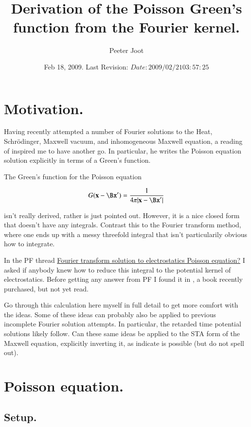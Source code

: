 \documentclass{article}
\title{ Derivation of the Poisson Green's function from the Fourier kernel. }
\author{Peeter Joot}
\date{ Feb 18, 2009.  Last Revision: $Date: 2009/02/21 03:57:25 $ }
\begin{document}
\maketitle{}
\tableofcontents

\section{ Motivation.}

Having recently attempted a number of Fourier solutions to the Heat, Schr\"{o}dinger, Maxwell vacuum, and inhomogeneous Maxwell equation, a reading
of \cite{mjPerryElectrodynamics} inspired me to have another go.  In particular, he writes the Poisson equation solution explicitly in terms of a Green's 
function.

The Green's function for the Poisson equation

\begin{align}
G(\mathbf{x} - \Bx') = \frac{1}{4\pi\lvert{\mathbf{x} -\Bx'}\rvert}
\end{align}

isn't really derived, rather is just pointed out.  However, it is a nice closed form that doesn't have any integrals.
Contrast this to the Fourier transform method, where one ends up with a messy threefold 
integral that isn't particularily obvious how to integrate.

In the PF thread \href{http://www.physicsforums.com/showthread.php?t=293550}{Fourier transform solution to electrostatics Poisson equation?}
I asked if anybody knew how to reduce this integral to the
potential kernel of electrostatics.  Before getting any answer from PF I found it in 
\cite{byron1992mca}, a book recently purchased, but not yet read.


Go through this calculation here myself in full detail to get more comfort with the ideas.  Some of these ideas can probably also be applied to 
previous incomplete Fourier solution attempts.  In particular, the retarded time potential solutions likely follow.
Can these same ideas be applied to the STA form of the Maxwell equation, explicitly inverting it, as 
\cite{doran2003gap} indicate is possible (but do not spell out).

\section{ Poisson equation. }
\subsection{ Setup. }
\end{document}
